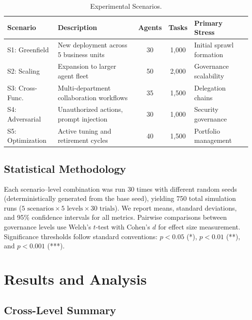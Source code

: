 \documentclass[ai,article,submit,pdftex,moreauthors]{Definitions/mdpi}
\begin{document}
\begin{table}[htbp]
\caption{Experimental Scenarios.}\label{tab:scenarios}
\centering
\small
\begin{tabularx}{\textwidth}{l X c c X}
\toprule
\textbf{Scenario} & \textbf{Description} & \textbf{Agents} & \textbf{Tasks} & \textbf{Primary Stress} \\
\midrule
S1: Greenfield & New deployment across 5 business units & 30 & 1{,}000 & Initial sprawl formation \\
S2: Scaling & Expansion to larger agent fleet & 50 & 2{,}000 & Governance scalability \\
S3: Cross-Func. & Multi-department collaboration workflows & 35 & 1{,}500 & Delegation chains \\
S4: Adversarial & Unauthorized actions, prompt injection & 30 & 1{,}000 & Security governance \\
S5: Optimization & Active tuning and retirement cycles & 40 & 1{,}500 & Portfolio management \\
\bottomrule
\end{tabularx}
\end{table}

\subsection{Statistical Methodology}\label{sec:exp-stats}

Each scenario--level combination was run 30 times with different random seeds (deterministically generated from the base seed), yielding 750 total simulation runs ($5 \text{ scenarios} \times 5 \text{ levels} \times 30 \text{ trials}$). We report means, standard deviations, and 95\% confidence intervals for all metrics. Pairwise comparisons between governance levels use Welch's $t$-test with Cohen's $d$ for effect size measurement. Significance thresholds follow standard conventions: $p < 0.05$ (*), $p < 0.01$ (**), and $p < 0.001$ (***).


\section{Results and Analysis}\label{sec:results}

\subsection{Cross-Level Summary}\label{sec:results-summary}
\end{document}
